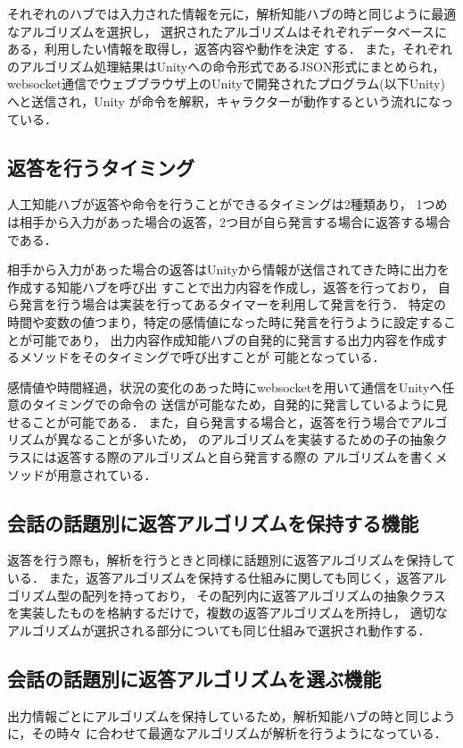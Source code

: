 それぞれのハブでは入力された情報を元に，解析知能ハブの時と同じように最適なアルゴリズムを選択し，
選択されたアルゴリズムはそれぞれデータベースにある，利用したい情報を取得し，返答内容や動作を決定
する．
また，それぞれのアルゴリズム処理結果はUnityへの命令形式であるJSON形式にまとめられ，
websocket通信でウェブブラウザ上のUnityで開発されたプログラム(以下Unity)へと送信され，Unity
が命令を解釈，キャラクターが動作するという流れになっている．

\subsection{返答を行うタイミング}
人工知能ハブが返答や命令を行うことができるタイミングは2種類あり，
1つめは相手から入力があった場合の返答，2つ目が自ら発言する場合に返答する場合である．

相手から入力があった場合の返答はUnityから情報が送信されてきた時に出力を作成する知能ハブを呼び出
すことで出力内容を作成し，返答を行っており，
自ら発言を行う場合は実装を行ってあるタイマーを利用して発言を行う．
特定の時間や変数の値つまり，特定の感情値になった時に発言を行うように設定することが可能であり，
出力内容作成知能ハブの自発的に発言する出力内容を作成するメソッドをそのタイミングで呼び出すことが
可能となっている．

感情値や時間経過，状況の変化のあった時にwebsocketを用いて通信をUnityへ任意のタイミングでの命令の
送信が可能なため，自発的に発言しているように見せることが可能である．
また，自ら発言する場合と，返答を行う場合でアルゴリズムが異なることが多いため，
のアルゴリズムを実装するための子の抽象クラスには返答する際のアルゴリズムと自ら発言する際の
アルゴリズムを書くメソッドが用意されている．

\subsection{会話の話題別に返答アルゴリズムを保持する機能}
返答を行う際も，解析を行うときと同様に話題別に返答アルゴリズムを保持している．
また，返答アルゴリズムを保持する仕組みに関しても同じく，返答アルゴリズム型の配列を持っており，
その配列内に返答アルゴリズムの抽象クラスを実装したものを格納するだけで，複数の返答アルゴリズムを所持し，
適切なアルゴリズムが選択される部分についても同じ仕組みで選択され動作する．

\subsection{会話の話題別に返答アルゴリズムを選ぶ機能}
出力情報ごとにアルゴリズムを保持しているため，解析知能ハブの時と同じように，その時々
に合わせて最適なアルゴリズムが解析を行うようになっている．


